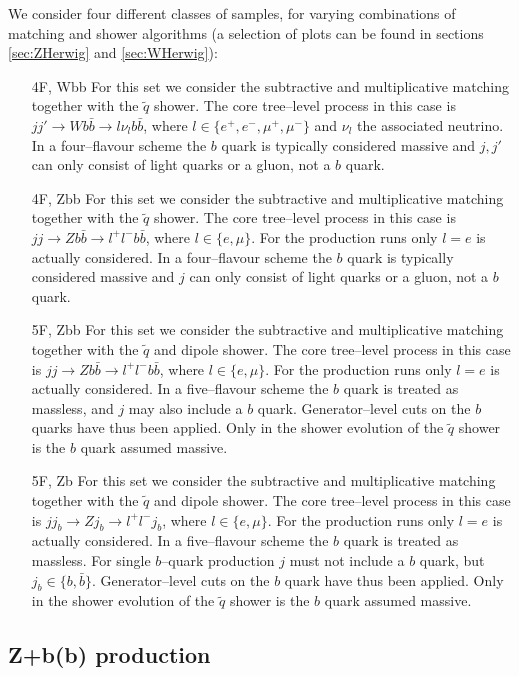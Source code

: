 \documentclass[11pt]{cernrep} \usepackage{graphicx,epsfig} 
\begin{document}
We consider four different classes of samples, for varying combinations of matching and shower algorithms
(a selection of plots can be found in sections \ref{sec:ZHerwig} and \ref{sec:WHerwig}):
\begin{itemize}
\item[4F, Wbb] For this set we consider the subtractive and multiplicative matching
together with the $\tilde{q}$ shower.
The core tree--level process in this case is $jj' \to W b\bar{b} \to l \nu_l b\bar{b}$,
where $l \in \{e^+, e^-, \mu^+, \mu^-\}$ and $\nu_l$ the associated neutrino.
In a four--flavour scheme the $b$ quark is typically considered massive
and $j,j'$ can only consist of light quarks or a gluon, not a $b$ quark.
\item[4F, Zbb] For this set we consider the subtractive and multiplicative matching
together with the $\tilde{q}$ shower.
The core tree--level process in this case is $jj \to Z b\bar{b} \to l^+ l^- b\bar{b}$,
where $l \in \{e, \mu\}$. For the production runs only $l=e$ is actually considered.
In a four--flavour scheme the $b$ quark is typically considered massive
and $j$ can only consist of light quarks or a gluon, not a $b$ quark.
\item[5F, Zbb] For this set we consider the subtractive and multiplicative matching
together with the $\tilde{q}$ and dipole shower.
The core tree--level process in this case is $jj \to Z b\bar{b} \to l^+ l^- b\bar{b}$,
where $l \in \{e, \mu\}$. For the production runs only $l=e$ is actually considered.
In a five--flavour scheme the $b$ quark is treated as massless,
and $j$ may also include a $b$ quark.
Generator--level cuts on the $b$ quarks have thus been applied.
Only in the shower evolution of the $\tilde{q}$ shower is the $b$ quark assumed massive.
\item[5F, Zb] For this set we consider the subtractive and multiplicative matching
together with the $\tilde{q}$ and dipole shower.
The core tree--level process in this case is $jj_b \to Z j_b \to l^+ l^- j_b$,
where $l \in \{e, \mu\}$. For the production runs only $l=e$ is actually considered.
In a five--flavour scheme the $b$ quark is treated as massless.
For single $b$--quark production $j$ must not include a $b$ quark, but $j_b \in \{b,\bar{b}\}$.
Generator--level cuts on the $b$ quark have thus been applied.
Only in the shower evolution of the $\tilde{q}$ shower is the $b$ quark assumed massive.
\end{itemize}

\subsection{Z+b(b) production \label{Zbb}}
\end{document}

